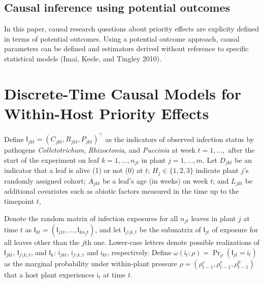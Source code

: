 \documentclass[]{article}
\begin{document}
\hypertarget{causal-inference-using-potential-outcomes}{%
\subsection{Causal inference using potential
outcomes}\label{causal-inference-using-potential-outcomes}}

In this paper, causal research questions about priority effects are
explicity defined in terms of potential outcomes. Using a potential
outcome approach, causal parameters can be defined and estimators
derived without reference to specific statistical models (Imai, Keele,
and Tingley 2010).

\hypertarget{discrete-time-causal-models-for-within-host-priority-effects}{%
\section{Discrete-Time Causal Models for Within-Host Priority
Effects}\label{discrete-time-causal-models-for-within-host-priority-effects}}

Define \(\mathsf{I}_{jkt} = (C_{jkt}, R_{jkt}, P_{jkt})^\intercal\) as
the indicators of observed infection status by pathogens
\emph{Colletotrichum}, \emph{Rhizoctonia}, and \emph{Puccinia} at week
\(t = 1, \dots,\) after the start of the experiment on leaf
\(k = 1, \dots, n_{jt}\) in plant \(j = 1, \dots, m\). Let \(D_{jkt}\)
be an indicator that a leaf is alive (1) or not (0) at \(t\);
\(H_{j} \in \{1, 2, 3\}\) indicate plant \(j\)'s randomly assigned
cohort; \(A_{jkt}\) be a leaf's age (in weeks) on week \(t\); and
\(L_{jkt}\) be additional covariates such as abiotic factors measured in
the time up to the timepoint \(t\),

Denote the random matrix of infection exposures for all \(n_{jt}\)
leaves in plant \(j\) at time \(t\) as
\(\mathsf{I}_{kt} = (\mathsf{I}_{j1t} , \dots, \mathsf{I}_{kn_jt})\),
and let \(\mathsf{I}_{j \setminus k, t}\) be the submatrix of
\(\mathsf{I}_{jt}\) of exposure for all leaves other than the \(j\)th
one. Lower-case letters denote possible realizations of
\(\mathsf{I}_{jkt}\), \(\mathsf{I}_{j \setminus k, t}\), and
\(\mathsf{I}_{k}\): \(\mathsf{i}_{jkt}\),
\(\mathsf{i}_{j \setminus k, t}\) and \(\mathsf{i}_{kt}\), respectively.
Define
\(\omega(\mathsf{i}_{t}; \rho) = \Pr_{\rho}(\mathsf{I}_{jt} = \mathsf{i}_{t})\)
as the marginal probability under within-plant pressure
\(\rho = (\rho^c_{t-1}, \rho^r_{t-1}, \rho^p_{t-1})\) that a host plant
experiences \(\mathsf{i}_t\) at time \(t\).
\end{document}
